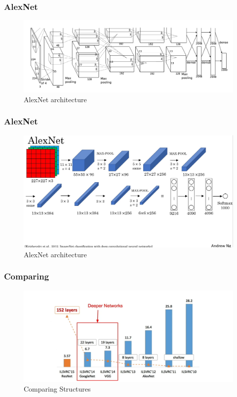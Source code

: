 \documentclass{beamer}
\begin{document}
\begin{frame}
\frametitle{AlexNet}

\begin{figure}
	\includegraphics[width=\linewidth]{Pics/alexnet.png}
	\caption{AlexNet architecture}
\end{figure}

\end{frame}

\begin{frame}
\frametitle{AlexNet}

\begin{figure}
	\includegraphics[width=\linewidth]{Pics/alexnetarch.jpg}
	\caption{AlexNet architecture}
\end{figure}

\end{frame}

\begin{frame}
\frametitle{Comparing}

\begin{figure}
	\includegraphics[width=\linewidth]{Pics/compare2.png}
	\caption{Comparing Structures}
\end{figure}

\end{frame}
\end{document}
